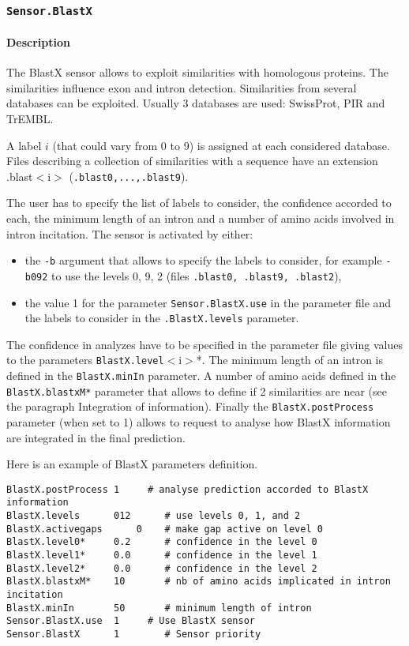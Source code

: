 
\subsubsection{\texttt{Sensor.BlastX}}

\paragraph{Description}

The BlastX sensor allows to exploit similarities with homologous
proteins. The similarities influence exon and intron detection.
Similarities from several databases can be exploited. Usually 3
databases are used: SwissProt, PIR and TrEMBL.

A label $i$ (that could vary from 0 to 9) is assigned at each
considered database. Files describing a collection of similarities with
a sequence have an extension .blast$<$i$>$ (\texttt{.blast0,...,.blast9}).

The user has to specify the list of labels to consider, the
confidence accorded to each, the minimum length of an intron and a
number of amino acids involved in intron incitation.  The sensor is
activated by either:
\begin{itemize}
\item the \texttt{-b} argument 
  that allows to specify the labels to consider, for example
  \texttt{-b092} to use the levels 0, 9, 2 (files \texttt{.blast0,
    .blast9, .blast2}),
\item the value 1 for the parameter \texttt{Sensor.BlastX.use} in
  the parameter file and the labels to consider in the
  \texttt{.BlastX.levels} parameter.
\end{itemize}
The confidence in analyzes have to be specified in the parameter file
giving values to the parameters \texttt{BlastX.level}$<$i$>$*.  The
minimum length of an intron is defined in the \texttt{BlastX.minIn}
parameter.  A number of amino acids defined in the
\texttt{BlastX.blastxM*} parameter that allows to define if 2
similarities are near (see the paragraph Integration of information).
Finally the \texttt{BlastX.postProcess} parameter (when set to 1)
allows to request to analyse how BlastX information are integrated in
the final prediction.

Here is an example of BlastX parameters definition.
\begin{Verbatim}[fontsize=\small]
BlastX.postProcess 1     # analyse prediction accorded to BlastX information
BlastX.levels      012      # use levels 0, 1, and 2
BlastX.activegaps      0    # make gap active on level 0
BlastX.level0*     0.2      # confidence in the level 0
BlastX.level1*     0.0      # confidence in the level 1
BlastX.level2*     0.0      # confidence in the level 2
BlastX.blastxM*    10       # nb of amino acids implicated in intron incitation
BlastX.minIn       50       # minimum length of intron
Sensor.BlastX.use  1     # Use BlastX sensor
Sensor.BlastX      1        # Sensor priority
\end{Verbatim}

